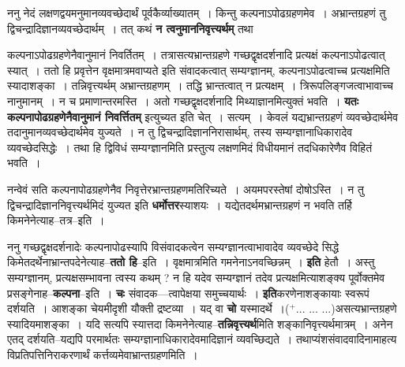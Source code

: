 \documentclass[article,12pt,a4paper]{memoir}
\newcommand{\add}[1]{($^{+}$#1)}
\begin{document}
	  \pstart ननु नेदं लक्षणद्वयमनुमानव्यवच्छेदार्थं पूर्वकैर्व्याख्यातम् । किन्तु कल्पनाऽपोढग्रहणमेव । अभ्रान्तग्रहणं तु द्विचन्द्रादिज्ञानव्यवच्छेदार्थम् । तत् कथं \textbf{न त्वनुमाननिवृत्त्यर्थम्} तथा  \leavevmode{} 
	  
	कल्पनाऽपोढग्रहणेनैवानुमानं निवर्तितम् । तत्रासत्यभ्रान्तग्रहणे गच्छद्वृक्षदर्शनादि प्रत्यक्षं कल्पनाऽपोढत्वात् स्यात् । ततो हि प्रवृत्तेन वृक्षमात्रमवाप्यते इति संवादकत्वात् सम्यग्ज्ञानम्, कल्पनाऽपोढत्वाच्च प्रत्यक्षमिति स्यादाशङ्का । तन्निवृत्त्यर्थम् अभ्रान्तग्रहणम् । तद्धि\edtext{}{\lemma{तद्धि}\Bfootnote{गच्छदवृक्ष\add{दर्शनम्}--\cite{dp-msD-n}}} भ्रान्तत्वात् न प्रत्यक्षम् । त्रिरूपलिङ्गजत्वाभावाच्च नानुमानम् । न च प्रमाणान्तरमस्ति । अतो गच्छद्वृक्षदर्शनादि मिथ्याज्ञानमित्युक्तं भवति । \textbf{यतः कल्पनापोढग्रहणेनैवानुमानं निवर्त्तितम्} इत्युच्यत इति चेत् । सत्यम् । केवलं यद्यभ्रान्तग्रहणं व्यवच्छेदार्थमेव तदानुमानव्यवच्छेदार्थमेव युज्यते । न तु द्विचन्द्रादिज्ञाननिरासार्थम्, तस्य सम्यग्ज्ञानाधिकारादेव व्यवच्छेदसिद्धेः । तथा हि द्विविधं सम्यग्ज्ञानमिति प्रस्तुत्य लक्षणमिदं विधीयमानं तदधिकारेणैव विहितं भवति ।
	\pend
      

	  \pstart नन्वेवं सति कल्पनापोढग्रहणेनैव निवृत्तेरभ्रान्तग्रहणमतिरिच्यते । अयमपरस्तेषां दोषोऽस्ति । न तु द्विचन्द्रादिज्ञाननिवृत्त्यर्थमिदं युज्यत इति \textbf{धर्मोत्तर}स्याशयः । यद्येतदर्थमभ्रान्तग्रहणं न भवति तर्हि किमनेनेत्याह--तत्र--इति ।
	\pend
      

	  \pstart ननु गच्छद्वृक्षदर्शनादेः कल्पनापोढस्यापि विसंवादकत्वेन सम्यग्ज्ञानत्वाभावादेव व्यवच्छेदे सिद्धे किमेतदर्थेनाभ्रान्तपदेनेत्याह--\textbf{ततो हि}--इति । वृक्षमात्रमिति गमनेनाऽनवच्छिन्नम् । \textbf{इति} हेतौ । अस्तु सम्यग्ज्ञानम्, प्रत्यक्षसम्भावना त्वस्य कथम् ? न हि यदेव सम्यग्ज्ञानं तदेव प्रत्यक्षमित्याशङ्क्य पूर्वोक्तमेव प्रसङ्गेनाह--\textbf{कल्पना}--इति । \textbf{चः} संवादक—त्वापेक्षया समुच्चयार्थः । \textbf{इति}करणेनाशङ्कायाः स्वरूपं दर्शयति । आशङ्का चेयमीदृशी यौक्ती द्रष्टव्या । यद् वा \textbf{चो} यस्मादर्थे ।\add{... ... ...}असत्यभ्रान्तग्रहणे स्यादियमाशङ्का । यदि सत्यपि स्यात्तदा किमनेनेत्याह--\textbf{तन्निवृत्त्यर्थ}मिति शङ्कानिवृत्त्यर्थमात्रम् । अनेन एतद् दर्शयति--यद्यपि परमार्थतः सम्यग्ज्ञानाधिकारादेवमादिज्ञानं व्यवच्छिद्यते । तथाप्यंशसंवादवादिनामाहत्य विप्रतिपत्तिनिराकरणार्थं क\leavevmode{}र्त्तव्यमेवाभ्रान्तग्रहणमिति ।
	\pend
      
\end{document}
